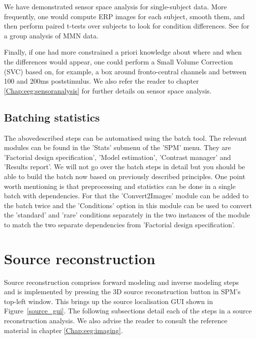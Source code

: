We have demonstrated sensor space analysis for single-subject data. More frequently, one would compute ERP images for each subject, smooth them, and then perform paired t-tests over subjects to look for condition differences. See \cite{marta_mmndcm} for a group analysis of MMN data.

Finally, if one had more constrained a priori knowledge about where and when the differences would appear, one could perform a Small Volume Correction (SVC) based on, for example, a box around fronto-central channels and between 100 and 200ms poststimulus. We also refer the reader to chapter \ref{Chap:eeg:sensoranalysis} for further details on sensor space analysis.

\subsection{Batching statistics}
The abovedescribed steps can be automatised using the batch tool. The relevant modules can be found in the 'Stats' submenu of the 'SPM' menu. They are 'Factorial design specification', 'Model estimation', 'Contrast manager' and 'Results report'. We will not go over the batch steps in detail but you should be able to build the batch now based on previously described principles. One point worth mentioning is that preprocessing and statistics can be done in a single batch with dependencies. For that the 'Convert2Images' module can be added to the batch twice and the 'Conditions' option in this module can be used to convert the 'standard' and 'rare' conditions separately  in the two instances of the module to match the two separate dependencies from 'Factorial design specification'.

\section{Source reconstruction}

Source reconstruction comprises forward modeling and inverse modeling steps and is implemented by pressing the 3D source reconstruction button in SPM's top-left window.
This brings up the source localisation GUI shown in Figure~\ref{source_gui}. The following subsections detail each of the steps in a source reconstruction analysis. We also advise the reader to consult the reference material in chapter \ref{Chap:eeg:imaging}.

